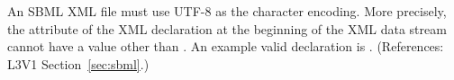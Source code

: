 An SBML XML file must use UTF-8 as the character encoding.  More
precisely, the  attribute of the XML declaration
at the beginning of the XML data stream cannot have a value other
than .  An example valid declaration is .  (References: L3V1
Section~\ref{sec:sbml}.) 

